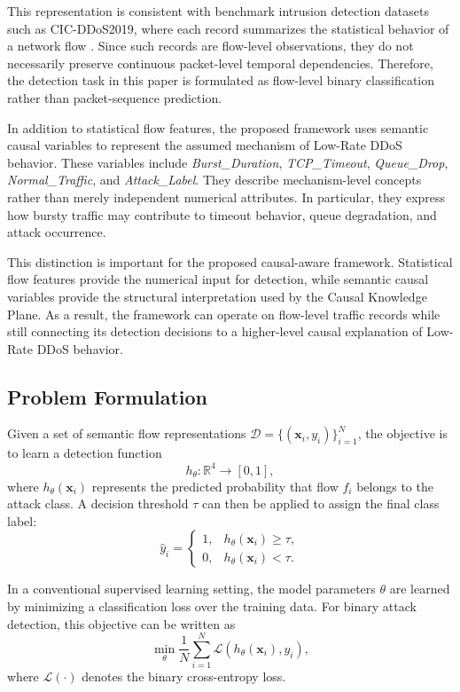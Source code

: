 \documentclass[journal]{IEEEtran}
\begin{document}
This representation is consistent with benchmark intrusion detection datasets such as CIC-DDoS2019, where each record summarizes the statistical behavior of a network flow \cite{sharafaldin2019cicddos}. Since such records are flow-level observations, they do not necessarily preserve continuous packet-level temporal dependencies. Therefore, the detection task in this paper is formulated as flow-level binary classification rather than packet-sequence prediction.

In addition to statistical flow features, the proposed framework uses semantic causal variables to represent the assumed mechanism of Low-Rate DDoS behavior. These variables include \textit{Burst\_Duration}, \textit{TCP\_Timeout}, \textit{Queue\_Drop}, \textit{Normal\_Traffic}, and \textit{Attack\_Label}. They describe mechanism-level concepts rather than merely independent numerical attributes. In particular, they express how bursty traffic may contribute to timeout behavior, queue degradation, and attack occurrence.

This distinction is important for the proposed causal-aware framework. Statistical flow features provide the numerical input for detection, while semantic causal variables provide the structural interpretation used by the Causal Knowledge Plane. As a result, the framework can operate on flow-level traffic records while still connecting its detection decisions to a higher-level causal explanation of Low-Rate DDoS behavior.

\subsection{Problem Formulation}
\label{subsec:problem_formulation}

Given a set of semantic flow representations $\mathcal{D} = \{(\mathbf{x}_i, y_i)\}_{i=1}^{N}$, the objective is to learn a detection function
\[
  h_{\theta}: \mathbb{R}^{4} \rightarrow [0,1],
\]
where $h_{\theta}(\mathbf{x}_i)$ represents the predicted probability that flow $f_i$ belongs to the attack class. A decision threshold $\tau$ can then be applied to assign the final class label:
\[
  \hat{y}_i =
  \begin{cases}
    1, & h_{\theta}(\mathbf{x}_i) \geq \tau, \\
    0, & h_{\theta}(\mathbf{x}_i) < \tau.
  \end{cases}
\]

In a conventional supervised learning setting, the model parameters $\theta$ are learned by minimizing a classification loss over the training data. For binary attack detection, this objective can be written as
\[
  \min_{\theta} \frac{1}{N} \sum_{i=1}^{N}
  \mathcal{L}\left(h_{\theta}(\mathbf{x}_i), y_i\right),
\]
where $\mathcal{L}(\cdot)$ denotes the binary cross-entropy loss.
\end{document}
